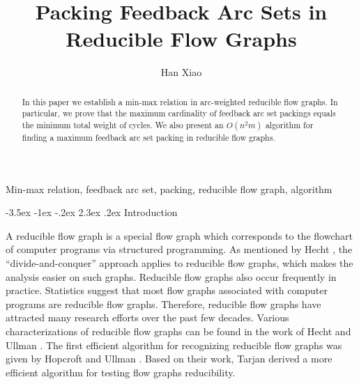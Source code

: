 \documentclass[11pt]{article}
\title{\bf Packing Feedback Arc Sets in Reducible Flow Graphs}
\author{Han Xiao}
\affil{Department of Mathematics, The University of Hong Kong,

Hong Kong, China

{\tt hxiao.math@connect.hku.hk}}
\makeatletter
\renewcommand\section{%
  \@startsection{section}{1}
                {\z@}%
                {-3.5ex \@plus -1ex \@minus -.2ex}%
                {2.3ex \@plus.2ex}%
                {\large\bfseries}%
}
\makeatother
\begin{document}
 \date{}
\maketitle

\begin{abstract}
In this paper we establish a min-max relation in arc-weighted reducible flow graphs. In particular, we prove that the maximum cardinality of feedback arc set packings equals the minimum total weight of cycles.  We also present an $O(n^2 m)$ algorithm for finding a maximum feedback arc set packing in reducible flow graphs.
\end{abstract}

\quad Min-max relation, feedback arc set, packing, reducible flow graph, algorithm


\jot


\section{Introduction}
\label{intro}

A reducible flow graph is a special flow graph which corresponds to the flowchart of computer programs via structured programming. As mentioned by Hecht \cite{Hech}, the ``divide-and-conquer'' approach applies to reducible flow graphs, which makes the analysis easier on such graphs. Reducible flow graphs also occur frequently in practice. Statistics suggest that most flow graphs associated with computer programs are reducible flow graphs. Therefore, reducible flow graphs have attracted many research efforts over the past few decades. Various characterizations of reducible flow graphs can be found in the work of Hecht and Ullman \cite{HecU1}. The first efficient algorithm for recognizing reducible flow graphs was given by Hopcroft and Ullman \cite{HopU}. Based on their work, Tarjan \cite{Tarj} derived a more efficient algorithm for testing flow graphs reducibility. 
\end{document}
